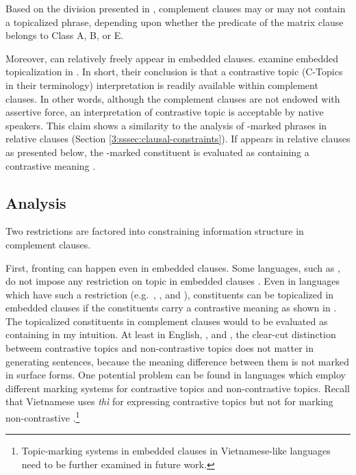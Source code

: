 \noindent Based on the division presented in
, complement clauses may or
may not contain a topicalized phrase, depending upon whether the
predicate of the matrix clause belongs to Class A, B, or E.


Moreover,  can relatively freely appear in embedded
clauses.  \citet{bianchi:frascarelli:10} examine embedded
topicalization in . In short, their
conclusion is that a contrastive topic (C-Topics in their terminology)
interpretation is readily available within complement clauses. In
other words, although the complement clauses are not endowed with
assertive force, an interpretation of contrastive topic is acceptable
by native speakers.  This claim shows a similarity to the analysis of
\onun-marked phrases in  relative clauses
(Section \ref{3:sssec:clausal-constraints}). If \nun
appears in relative clauses as presented below, the \onun-marked
constituent is evaluated as containing a contrastive meaning
\citep{lim:12}.





\subsection{Analysis}
\label{10:ssec:embedded:analysis}

Two restrictions are factored into constraining information
structure in complement clauses.

First,  fronting can happen even in embedded clauses. Some
languages, such as , do not impose any restriction on
topic  in embedded clauses \citep{roberts:11}. Even in
languages which have such a restriction (e.g.\ ,
, and ), constituents can be topicalized in
embedded clauses if the constituents carry a contrastive meaning as
shown in .  The topicalized constituents in
complement clauses would to be evaluated as containing
 in my intuition.  At least in English,
, and , the clear-cut distinction betweem
contrastive topics and non-contrastive topics does not matter in
generating sentences,
because the meaning difference between them is
not marked in surface forms.  One potential problem can be found in
languages which employ different marking systems for contrastive
topics and non-contrastive topics. Recall that Vietnamese uses
\textit{th{\`i}} for expressing contrastive topics but not for marking
non-contrastive  \citep{nguyen:06}.\footnote{Topic-marking
  systems in embedded clauses in Vietnamese-like languages need to be
  further examined in future work.}


